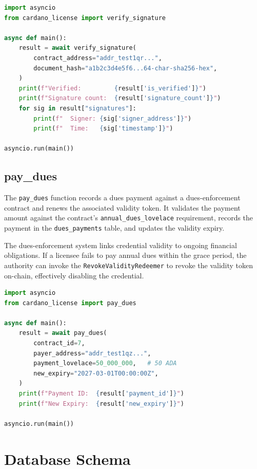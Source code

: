 \begin{lstlisting}[language=Python,
  caption={Verifying a document's signatures.}]
import asyncio
from cardano_license import verify_signature

async def main():
    result = await verify_signature(
        contract_address="addr_test1qr...",
        document_hash="a1b2c3d4e5f6...64-char-sha256-hex",
    )
    print(f"Verified:         {result['is_verified']}")
    print(f"Signature count:  {result['signature_count']}")
    for sig in result["signatures"]:
        print(f"  Signer: {sig['signer_address']}")
        print(f"  Time:   {sig['timestamp']}")

asyncio.run(main())
\end{lstlisting}

\subsection{pay\_dues}

The \texttt{pay\_dues} function records a dues payment against a
dues-enforcement contract and renews the associated validity token.  It
validates the payment amount against the contract's
\texttt{annual\_dues\_lovelace} requirement, records the payment in the
\texttt{dues\_payments} table, and updates the validity expiry.

The dues-enforcement system links credential validity to ongoing financial
obligations.  If a licensee fails to pay annual dues within the grace
period, the authority can invoke the \texttt{RevokeValidityRedeemer} to
revoke the validity token on-chain, effectively disabling the credential.

\begin{lstlisting}[language=Python,
  caption={Paying annual dues to maintain credential validity.}]
import asyncio
from cardano_license import pay_dues

async def main():
    result = await pay_dues(
        contract_id=7,
        payer_address="addr_test1qz...",
        payment_lovelace=50_000_000,   # 50 ADA
        new_expiry="2027-03-01T00:00:00Z",
    )
    print(f"Payment ID:  {result['payment_id']}")
    print(f"New Expiry:  {result['new_expiry']}")

asyncio.run(main())
\end{lstlisting}


\section{Database Schema}
\label{sec:db-schema}

